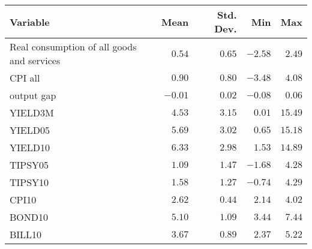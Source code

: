 \begin{tabular}{lrrrr} \hline Variable & Mean & Std. Dev. & Min & Max \\ \hline Real consumption of all goods and services & $0.54$ & $0.65$ & $-2.58$ & $2.49$ \\ CPI all  & $0.90$ & $0.80$ & $-3.48$ & $4.08$ \\ output gap & $-0.01$ & $0.02$ & $-0.08$ & $0.06$ \\ YIELD3M & $4.53$ & $3.15$ & $0.01$ & $15.49$ \\ YIELD05 & $5.69$ & $3.02$ & $0.65$ & $15.18$ \\ YIELD10 & $6.33$ & $2.98$ & $1.53$ & $14.89$ \\ TIPSY05 & $1.09$ & $1.47$ & $-1.68$ & $4.28$ \\ TIPSY10 & $1.58$ & $1.27$ & $-0.74$ & $4.29$ \\ CPI10 & $2.62$ & $0.44$ & $2.14$ & $4.02$ \\ BOND10 & $5.10$ & $1.09$ & $3.44$ & $7.44$ \\ BILL10 & $3.67$ & $0.89$ & $2.37$ & $5.22$ \\ \hline \end{tabular}